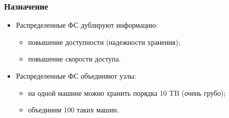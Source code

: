 \begin{frame}
\frametitle{Назначение}
\begin{itemize}
  \item<1-> Распределенные ФС дублируют информацию:
    \begin{itemize}
      \item повышение доступности (надежности хранения);
      \item повышение скорости доступа.
    \end{itemize}
  \item<2-> Распределенные ФС объединяют узлы:
    \begin{itemize}
      \item на одной машине можно хранить порядка 10 TB (очень грубо);
      \item объединим 100 таких машин.
    \end{itemize}
\end{itemize}
\end{frame}
